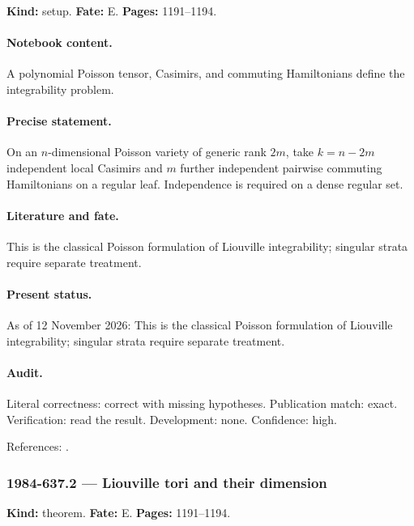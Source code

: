 \label{item:1984-637.1}

\noindent\textbf{Kind:} setup. \textbf{Fate:} E. \textbf{Pages:} 1191--1194.\par

\paragraph{Notebook content.} A polynomial Poisson tensor, Casimirs, and commuting Hamiltonians define the integrability problem.

\paragraph{Precise statement.} On an \(n\)-dimensional Poisson variety of generic rank \(2m\), take \(k=n-2m\) independent local Casimirs and \(m\) further independent pairwise commuting Hamiltonians on a regular leaf. Independence is required on a dense regular set.

\paragraph{Literature and fate.} This is the classical Poisson formulation of Liouville integrability; singular strata require separate treatment.

\paragraph{Present status.} As of 12 November 2026: This is the classical Poisson formulation of Liouville integrability; singular strata require separate treatment.

\paragraph{Audit.} Literal correctness: correct with missing hypotheses. Publication match: exact. Verification: read the result. Development: none. Confidence: high.

\noindent References: \citep{adler1982kowalewski,semenov1983classical}.\par

\subsubsection{1984-637.2 --- Liouville tori and their dimension}

\label{item:1984-637.2}

\noindent\textbf{Kind:} theorem. \textbf{Fate:} E. \textbf{Pages:} 1191--1194.\par

